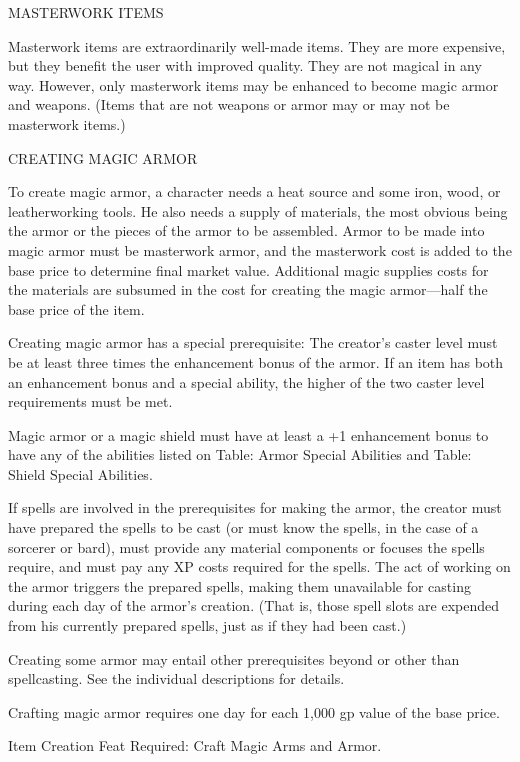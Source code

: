 \documentclass{article}
\begin{document}
\vspace{12pt}
{\large{}MASTERWORK ITEMS}

Masterwork items are extraordinarily well-made items. They are more expensive, 
but they benefit the user with improved quality. They are not magical in any way. 
However, only masterwork items may be enhanced to become magic armor and weapons. 
(Items that are not weapons or armor may or may not be masterwork items.)

\vspace{12pt}
{\large{}CREATING MAGIC ARMOR}

To create magic armor, a character needs a heat source and some iron, wood, or 
leatherworking tools. He also needs a supply of materials, the most obvious being 
the armor or the pieces of the armor to be assembled. Armor to be made into magic 
armor must be masterwork armor, and the masterwork cost is added to the base price 
to determine final market value. Additional magic supplies costs for the materials 
are subsumed in the cost for creating the magic armor---half the base price of 
the item.

Creating magic armor has a special prerequisite: The creator's caster level must 
be at least three times the enhancement bonus of the armor. If an item has both 
an enhancement bonus and a special ability, the higher of the two caster level 
requirements must be met.

Magic armor or a magic shield must have at least a +1 enhancement bonus to have 
any of the abilities listed on Table: Armor Special Abilities and Table: Shield 
Special Abilities.

If spells are involved in the prerequisites for making the armor, the creator must 
have prepared the spells to be cast (or must know the spells, in the case of a 
sorcerer or bard), must provide any material components or focuses the spells require, 
and must pay any XP costs required for the spells. The act of working on the armor 
triggers the prepared spells, making them unavailable for casting during each day 
of the armor's creation. (That is, those spell slots are expended from his currently 
prepared spells, just as if they had been cast.)

Creating some armor may entail other prerequisites beyond or other than spellcasting. 
See the individual descriptions for details.

Crafting magic armor requires one day for each 1,000 gp value of the base price.

Item Creation Feat Required: Craft Magic Arms and Armor.
\end{document}

